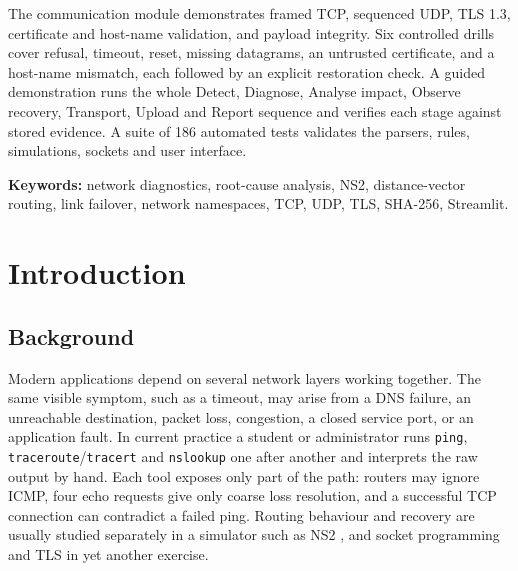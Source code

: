 \documentclass[12pt,a4paper]{report}
\numberwithin{equation}{chapter}
\newcommand{\testCount}{186}
\begin{document}
The communication module demonstrates framed TCP, sequenced UDP, TLS 1.3, certificate and host-name validation, and payload integrity. Six controlled drills cover refusal, timeout, reset, missing datagrams, an untrusted certificate, and a host-name mismatch, each followed by an explicit restoration check. A guided demonstration runs the whole Detect, Diagnose, Analyse impact, Observe recovery, Transport, Upload and Report sequence and verifies each stage against stored evidence. A suite of \testCount{} automated tests validates the parsers, rules, simulations, sockets and user interface.

\textbf{Keywords:} network diagnostics, root-cause analysis, NS2, distance-vector routing, link failover, network namespaces, TCP, UDP, TLS, SHA-256, Streamlit.

\clearpage
\setcounter{tocdepth}{1}
\tableofcontents

\clearpage
\listoffigures
{}

\clearpage
\listoftables
{}

\clearpage
{}
\setcounter{page}{1}

\chapter{Introduction}

\section{Background}
Modern applications depend on several network layers working together. The same visible symptom, such as a timeout, may arise from a DNS failure, an unreachable destination, packet loss, congestion, a closed service port, or an application fault. In current practice a student or administrator runs \texttt{ping}, \texttt{traceroute}/\texttt{tracert} and \texttt{nslookup} one after another and interprets the raw output by hand. Each tool exposes only part of the path: routers may ignore ICMP, four echo requests give only coarse loss resolution, and a successful TCP connection can contradict a failed ping. Routing behaviour and recovery are usually studied separately in a simulator such as NS2 \cite{ns2book}, and socket programming and TLS \cite{tcp,udp,tls13} in yet another exercise.
\end{document}
